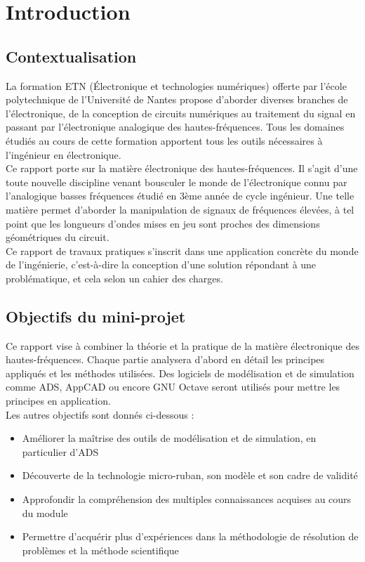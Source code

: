 \documentclass[french]{article}
\begin{document}
\section{Introduction}
\subsection{Contextualisation}
La formation ETN (Électronique et technologies numériques) offerte par l'école polytechnique de l'Université de Nantes propose d'aborder diverses branches de l'électronique, de la conception de circuits numériques au traitement du signal en passant par l'électronique analogique des hautes-fréquences. Tous les domaines étudiés au cours de cette formation apportent tous les outils nécessaires à l'ingénieur en électronique.\\
Ce rapport porte sur la matière électronique des hautes-fréquences. Il s'agit d'une toute nouvelle discipline venant bousculer le monde de l'électronique connu par l'analogique basses fréquences étudié en 3ème année de cycle ingénieur. Une telle matière permet d'aborder la manipulation de signaux de fréquences élevées, à tel point que les longueurs d'ondes mises en jeu sont proches des dimensions géométriques du circuit.\\
Ce rapport de travaux pratiques s'inscrit dans une application concrète du monde de l'ingénierie, c'est-à-dire la conception d'une solution répondant à une problématique, et cela selon un cahier des charges.\\

\subsection{Objectifs du mini-projet}
Ce rapport vise à combiner la théorie et la pratique de la matière électronique des hautes-fréquences. Chaque partie analysera d'abord en détail les principes appliqués et les méthodes utilisées. Des logiciels de modélisation et de simulation comme ADS, AppCAD ou encore GNU Octave seront utilisés pour mettre les principes en application.\\

\noindent Les autres objectifs sont donnés ci-dessous :\\

\begin{itemize}
	\item Améliorer la maîtrise des outils de modélisation et de simulation, en particulier d'ADS\\
	\item Découverte de la technologie micro-ruban, son modèle et son cadre de validité\\
	\item Approfondir la compréhension des multiples connaissances acquises au cours du module\\
	\item Permettre d'acquérir plus d'expériences dans la méthodologie de résolution de problèmes et la méthode scientifique
\end{itemize}
\end{document}
